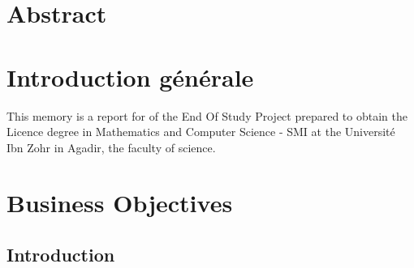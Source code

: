 \documentclass[11pt, openany]{report}
\begin{document}
\chapter*{Abstract }

  

\renewcommand{\baselinestretch}{1.30}\small \normalsize

\tableofcontents
\listoffigures
\listoftables
\renewcommand{\baselinestretch}{1.18}\small \normalsize
\newpage
{}

\chapter*{Introduction générale }


This memory is a report for of the End Of Study Project prepared to obtain the Licence degree in Mathematics and Computer Science - SMI at the Université Ibn Zohr in Agadir, the faculty of science.\\


\vskip12mm

\clearpage   
\chapter{Business Objectives}
\section*{Introduction}
\end{document}

